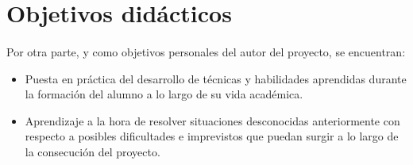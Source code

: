 \section{Objetivos didácticos}

\paragraph{}Por otra parte, y como objetivos personales del autor del proyecto,
se encuentran:

\begin{itemize}
   \item Puesta en práctica del desarrollo de técnicas y habilidades aprendidas
   durante la formación del alumno a lo largo de su vida académica.

   \item Aprendizaje a la hora de resolver situaciones desconocidas
   anteriormente con respecto a posibles dificultades e imprevistos que puedan
   surgir a lo largo de la consecución del proyecto.
\end{itemize}
